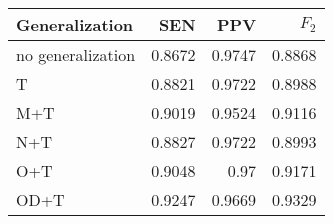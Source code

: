 \begin{table}[htbp]
  \caption{}
  \label{tab:}
  \centering
  \begin{tabular}[h]{@{}lrrr@{}}
    \toprule
    Generalization & SEN & PPV & \(F_2\) \\
    \midrule
no generalization	&	0.8672	&	0.9747	&	0.8868 \\
T	&	0.8821	&	0.9722	&	0.8988 \\
M+T	&	0.9019	&	0.9524	&	0.9116 \\
N+T	&	0.8827	&	0.9722	&	0.8993 \\
O+T	&	0.9048	&	0.97	&	0.9171 \\
OD+T	&	0.9247	&	0.9669	&	0.9329 \\
    \bottomrule
  \end{tabular}
\end{table}
